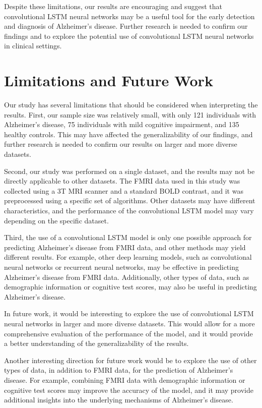 \documentclass[10pt]{article}
\begin{document}
	Despite these limitations, our results are encouraging and suggest that convolutional LSTM neural networks may be a useful tool for the early detection and diagnosis of Alzheimer's disease. Further research is needed to confirm our findings and to explore the potential use of convolutional LSTM neural networks in clinical settings.

	\section{Limitations and Future Work}

	Our study has several limitations that should be considered when interpreting the results. First, our sample size was relatively small, with only 121 individuals with Alzheimer's disease, 75 individuals with mild cognitive impairment, and 135 healthy controls. This may have affected the generalizability of our findings, and further research is needed to confirm our results on larger and more diverse datasets.

	Second, our study was performed on a single dataset, and the results may not be directly applicable to other datasets. The FMRI data used in this study was collected using a 3T MRI scanner and a standard BOLD contrast, and it was preprocessed using a specific set of algorithms. Other datasets may have different characteristics, and the performance of the convolutional LSTM model may vary depending on the specific dataset.

	Third, the use of a convolutional LSTM model is only one possible approach for predicting Alzheimer's disease from FMRI data, and other methods may yield different results. For example, other deep learning models, such as convolutional neural networks or recurrent neural networks, may be effective in predicting Alzheimer's disease from FMRI data. Additionally, other types of data, such as demographic information or cognitive test scores, may also be useful in predicting Alzheimer's disease.

	In future work, it would be interesting to explore the use of convolutional LSTM neural networks in larger and more diverse datasets. This would allow for a more comprehensive evaluation of the performance of the model, and it would provide a better understanding of the generalizability of the results.

	Another interesting direction for future work would be to explore the use of other types of data, in addition to FMRI data, for the prediction of Alzheimer's disease. For example, combining FMRI data with demographic information or cognitive test scores may improve the accuracy of the model, and it may provide additional insights into the underlying mechanisms of Alzheimer's disease.
\end{document}
